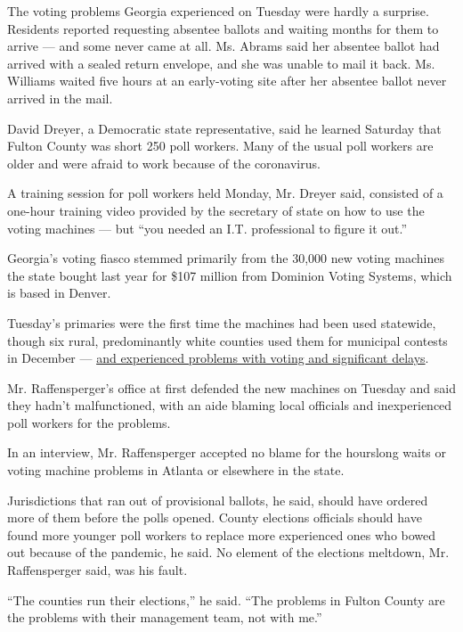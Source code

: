 The voting problems Georgia experienced on Tuesday were hardly a
surprise. Residents reported requesting absentee ballots and waiting
months for them to arrive --- and some never came at all. Ms. Abrams
said her absentee ballot had arrived with a sealed return envelope, and
she was unable to mail it back. Ms. Williams waited five hours at an
early-voting site after her absentee ballot never arrived in the mail.

David Dreyer, a Democratic state representative, said he learned
Saturday that Fulton County was short 250 poll workers. Many of the
usual poll workers are older and were afraid to work because of the
coronavirus.

A training session for poll workers held Monday, Mr. Dreyer said,
consisted of a one-hour training video provided by the secretary of
state on how to use the voting machines --- but ``you needed an I.T.
professional to figure it out.''

Georgia's voting fiasco stemmed primarily from the 30,000 new voting
machines the state bought last year for \$107 million from Dominion
Voting Systems, which is based in Denver.

Tuesday's primaries were the first time the machines had been used
statewide, though six rural, predominantly white counties used them for
municipal contests in December ---
\href{https://www.ajc.com/news/state--regional-govt--politics/problem-with-new-election-equipment-delays-voting-georgia-counties/vxltEshk0grck0uJiWA5RM/}{and
experienced problems with voting and significant delays}.

Mr. Raffensperger's office at first defended the new machines on Tuesday
and said they hadn't malfunctioned, with an aide blaming local officials
and inexperienced poll workers for the problems.

In an interview, Mr. Raffensperger accepted no blame for the hourslong
waits or voting machine problems in Atlanta or elsewhere in the state.

Jurisdictions that ran out of provisional ballots, he said, should have
ordered more of them before the polls opened. County elections officials
should have found more younger poll workers to replace more experienced
ones who bowed out because of the pandemic, he said. No element of the
elections meltdown, Mr. Raffensperger said, was his fault.

``The counties run their elections,'' he said. ``The problems in Fulton
County are the problems with their management team, not with me.''

